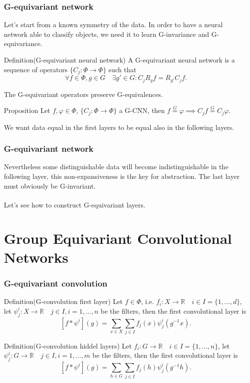 \documentclass{beamer}
\newcommand{\R}{\mathbb{R}}
\newcommand{\req}[1]{\stackrel{#1}{=}}
\begin{document}

\begin{frame}
    \frametitle{G-equivariant network}
    Let's start from a known symmetry of the data.
    In order to have a neural network able to classify objects, we need it to learn G-invariance and G-equivariance.
    \begin{block}{Definition(G-equivariant neural network)}
        A G-equivariant neural network is a sequence of operators $\{C_j : \Phi \to \Phi \}$ such that 
        \[ \forall f \in \Phi, g \in G \quad \exists g' \in G : C_jR_gf = R_{g'}C_jf.\]
    \end{block}
    The G-equivariant operators preserve G-equivalences.
    \begin{alertblock}{Proposition}
        Let $f,\varphi \in \Phi$, $\{C_j : \Phi \to \Phi \}$ a G-CNN, then $f \req{G} \varphi \implies C_jf \req{G} C_j\varphi$.
    \end{alertblock}
    We want data equal in the first layers to be equal also in the following layers.
\end{frame}

\begin{frame}
    \frametitle{G-equivariant network}
    Nevertheless some distinguishable data will become indistinguishable in the following layer, this non-expansiveness is the key for abstraction.
    The last layer must obviously be G-invariant.\\
    \hfill \\
    Let's see how to construct G-equivariant layers.
\end{frame}

\section{Group Equivariant Convolutional Networks}

\begin{frame}
    \frametitle{G-equivariant convolution}
    \begin{block}{Definition(G-convolution first layer)}
        Let $f \in \Phi$, i.e. $f_i : X \to \R \quad i \in I=\{1,...,d\}$, let $\psi_j^i : X \to \R \quad j \in I, i = 1,...,n$ be the filters, then the first convolutional layer is 
        \[ [f*\psi^i](g) = \sum_{x \in X}\sum_{j \in I}f_j(x)\psi_j^i(g^{-1}x).\]   
    \end{block}
    \begin{block}{Definition(G-convolution hiddel layers)}
        Let $f_i : G \to \R \quad i \in I=\{1,...,n\}$, let $\psi_j^i : G \to \R \quad j \in I, i = 1,...,m$ be the filters, then the first convolutional layer is 
        \[ [f*\psi^i](g) = \sum_{h \in G}\sum_{j \in I}f_j(h)\psi_j^i(g^{-1}h).\]   
    \end{block}
\end{frame}
\end{document}

